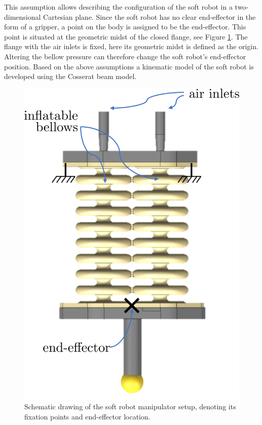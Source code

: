 This assumption allows describing the configuration of the soft robot in a two-dimensional Cartesian plane. Since the soft robot has no clear end-effector in the form of a gripper, a point on the body is assigned to be the end-effector. This point is situated at the geometric midst of the closed flange, see Figure \ref{fig2:setup}. The flange with the air inlets is fixed, here its geometric midst is defined as the origin. Altering the bellow pressure can therefore change the soft robot's end-effector position. Based on the above assumptions a kinematic model of the soft robot is developed using the Cosserat beam model. 



\begin{figure}[H]
\begin{minipage}{.5\textwidth}
  \centering
  \includegraphics[width =0.8\linewidth]{Figures/Chapter2/setup.png}
  \caption{Schematic drawing of the soft robot manipulator setup, denoting its fixation points and end-effector location.}
  \label{fig2:setup}
\end{minipage}
\begin{minipage}{.5\textwidth}
  \centering

\end{minipage}
\end{figure}
